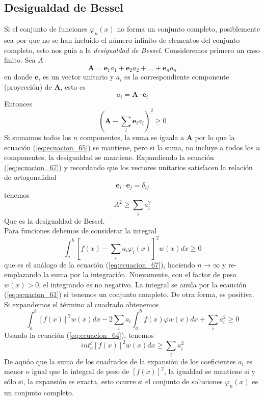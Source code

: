 \subsection{Desigualdad de Bessel}
Si el conjunto de funciones $\varphi_{n} (x)$ no forma un conjunto completo, posiblemente sea por que no se han incluido el número infinito de elementos del conjunto completo,  esto nos guía a la \emph{desigualdad de Bessel}. Consideremos primero un caso finito. Sea $A$ 
\begin{equation}
\mathbf{A} = \mathbf{e}_{1} a_{1} + \mathbf{e}_{2} a_{2} + \ldots + \mathbf{e}_{n} a_{n} 
\label{eq:ecuacion_65}
\end{equation}
en donde $\mathbf{e}_{i}$ es un vector unitario y $a_{i}$ es la correspondiente componente (proyección) de $\mathbf{A}$, esto es
\begin{equation}
a_{i} = \mathbf{A} \cdot \mathbf{e}_{i} \label{eq:ecuacion_66}
\end{equation}
Entonces
\begin{equation}
\left( \mathbf{A} - \sum_{i} \mathbf{e}_{i} a_{i} \right)^{2} \geq 0 \label{eq:ecuacion_67}
\end{equation}
Si sumamos todos los $n$ componentes, la suma se iguala a $\mathbf{A}$ por lo que la ecuación (\ref{eq:ecuacion_65}) se mantiene, pero si la suma, no incluye a todos los $n$ componentes, la desigualdad se mantiene. Expandiendo la ecuación (\ref{eq:ecuacion_67}) y recordando que los vectores unitarios satisfacen la relación de ortogonalidad
\begin{equation}
\mathbf{e}_{i} \cdot \mathbf{e}_{j} =  \delta_{ij} \label{eq:ecuacion_68}
\end{equation}
tenemos
\begin{equation}
A^{2} \geq \sum_{i} a_{i}^{2} \label{eq:ecuacion_69}
\end{equation}
Que es la desigualdad de Bessel.
\\
Para funciones debemos de considerar la integral
\begin{equation}
\int_{a}^{b} \left[ f(x) - \sum_{i} a_{i} \varphi_{i}(x) \right]^{2} w(x) dx \geq 0 \label{eq:ecuacion_70}
\end{equation}
que es el análogo de la ecuación (\ref{eq:ecuacion_67}), haciendo $n \to \infty$ y re-emplazando la suma por la integración. Nuevamente, con el factor de peso $w(x) >0 $, el integrando es no negativo. La integral se anula por la ecaución (\ref{eq:ecuacion_61}) si tenemos un conjunto completo. De otra forma, es positiva. Si expandemos el término al cuadrado obtenemos
\begin{equation}
\int_{a}^{b} [ f(x) ]^{2} w(x) dx - 2 \sum_{i} a_{i} \int_{a}^{b} f(x) \varphi w(x) dx  + \sum_{i} a_{i}^{2} \geq 0
\label{eq:ecuacion_71}
\end{equation}
Usando la ecuación (\ref{eq:ecuacion_64}), tenemos
\begin{equation}
int_{a}^{b} [f(x)]^{2} w(x) dx \geq \sum_{i} a_{i}^{2} \label{eq:ecuacion_72}
\end{equation}
De aquóo que la suma de los cuadrados de la expansión de los coeficientes $a_{i}$ es menor o igual que la integral de peso de $[f(x)]^{2}$, la igualdad se mantiene si y sólo si, la expansión es exacta, esto ocurre si el conjunto de soluciones $\varphi_{n}(x)$ es un conjunto completo.

